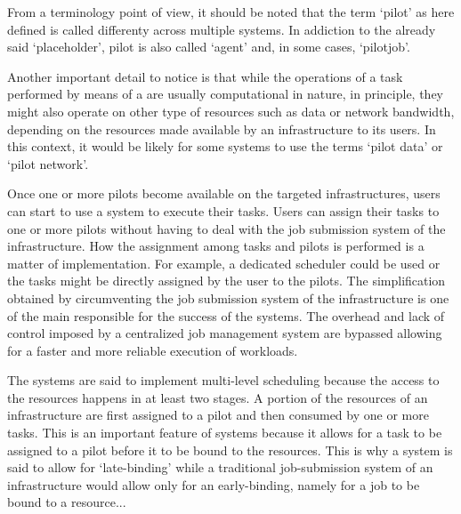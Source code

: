 \documentclass{sig-alternate}
\begin{document}
From a terminology point of view, it should be noted that the term `pilot' as here defined is called differenty across multiple \pilotjob systems. In addiction to the already said `placeholder', pilot is also called `agent' and, in some cases, `pilotjob'.

 

Another important detail to notice is that while the operations of a task performed by means of a \pilot are usually computational in nature, in principle, they might also operate on other type of resources such as data or network bandwidth, depending on the resources made available by an infrastructure to its users. In this context, it would be likely for some \pilotjob systems to use the terms `pilot data' or `pilot network'.



Once one or more pilots become available on the targeted infrastructures, users can start to use a \pilotjob system to execute their tasks. Users can assign their tasks to one or more pilots without having to deal with the job submission system of the infrastructure. How the assignment among tasks and pilots is performed is a matter of implementation. For example, a dedicated scheduler could be used or the tasks might be directly assigned by the user to the pilots. The simplification obtained by circumventing the job submission system of the infrastructure is one of the main responsible for the success of the \pilotjob systems. The overhead and lack of control imposed by a centralized job management system are bypassed allowing for a faster and more reliable execution of workloads. 

The \pilotjob systems are said to implement multi-level scheduling because the access to the resources happens in at least two stages. A portion of the resources of an infrastructure are first assigned to a pilot and then consumed by one or more tasks. This is an important feature of \pilotjob systems because it allows for a task to be assigned to a pilot before it to be bound to the resources. This is why a \pilotjob system is said to allow for `late-binding' while a traditional job-submission system of an infrastructure would allow only for an early-binding, namely for a job to be bound to a resource...   
\end{document}
